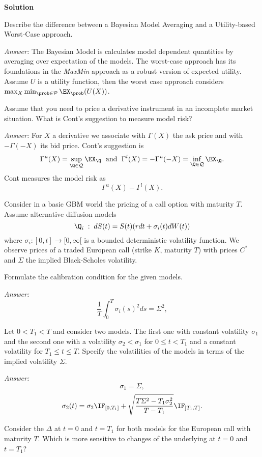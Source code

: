 \documentclass[11pt,a4paper,titlepage]{article}
\begin{document}
\item[]{\bf Solution}
\item[(a)]
Describe the difference between a Bayesian Model Averaging and a Utility-based Worst-Case
approach.

{\it Answer:} The Bayesian Model is calculates model dependent quantities by averaging over  expectation of the models. The worst-case approach has its foundations in the {\it MaxMin} approach as a robust version of expected utility. Assume $U$ is a utility function, then
the worst case approach considers
$\max _X \min_{\prob \in {\cal P}} \EX_{\prob}(U(X))$.

\item[(b)] Assume that you need to price a derivative instrument in an incomplete market situation. What is Cont's suggestion to measure model risk?

{\it Answer:}
For $X$ a derivative we associate with
$\Gamma(X)$ the ask price and with $-\Gamma(-X)$ its bid price.
Cont's suggestion is
$$
\Gamma^u(X)=\sup_{\Q \in {\cal Q}} \EX_{\Q} \; \mbox{ and } \;
\Gamma^l(X)= -\Gamma^u(-X)=\inf_{\Q \in {\cal Q}} \EX_{\Q}.
$$
Cont measures the model risk as
$$
\Gamma^u(X)-
\Gamma^l(X).
$$

\item[(c)]
Consider in a basic GBM world the pricing of a call option with maturity $T$.
Assume alternative diffusion models
\begin{equation}
\Q_i\;:\; dS(t) = S(t)(r dt + \sigma_i(t) dW(t))
\end{equation}
where $ \sigma_i: [0,t] \rightarrow [0, \infty[ $ is a bounded deterministic volatility function.
We observe prices of a traded European call (strike $K$, maturity $T$) with prices $C^*$ and
$\Sigma$ the implied Black-Scholes volatility.
\item[(i)]
Formulate the calibration condition for the given models.

{\it Answer:}
\begin{equation}
\frac{1}{T} \int_0^T  \sigma_i(s)^2 ds = \Sigma^2,
\end{equation}
\item[(ii)]
Let $0< T_1 <T$ and consider two models. The first one with constant volatility $\sigma_1$ and the second one with a volatility $\sigma_2 < \sigma _1$ for $0 \leq t <T_1$ and a constant volatility for $T_1\leq t \leq T$. Specify  the  volatilities of the models in terms of the implied volatility $\Sigma $.

{\it Answer:}
$$
\sigma_1 = \Sigma,
$$
$$
\sigma_2(t) = \sigma_2 \IF_{[0,T_1]}+ \sqrt{\frac{T\Sigma^2 -T_1\sigma_2^2}{T-T_1}}\IF_{]T_1, T]}.
$$
\item[(iii)]
Consider the $\Delta$ at $t=0$ and $t=T_1$ for both models for the European call with maturity $T$. Which is more sensitive to changes of the underlying at $t=0$ and $t=T_1$?
\end{document}
